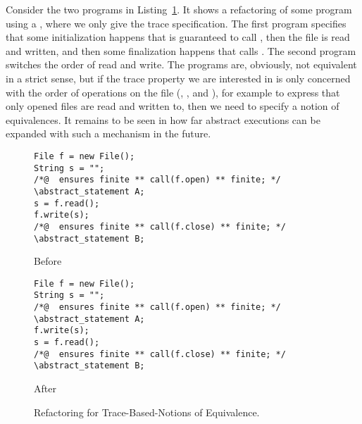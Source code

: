Consider the two programs in Listing~\ref{lst:sth}.
It shows a refactoring of some program using a , where we only give the trace specification.
The first program specifies that some initialization happens that is guaranteed to call , then the file is read and written,
and then some finalization happens that calls .
The second program switches the order of read and write.
The programs are, obviously, not equivalent in a strict sense, but if the trace property we are interested in is only concerned with the order of operations on the file 
(, ,  and ), for example to express that only opened files are read and written to, then we need to specify a notion of equivalences.
It remains to be seen in how far abstract executions can be expanded with such a mechanism in the future.

\begin{figure}[tbp]
\captionsetup{type=lstlisting}
\centering
\begin{sublstlisting}{.8\linewidth}
\begin{lstlisting}[style=refinity]
File f = new File();
String s = "";
/*@  ensures finite ** call(f.open) ** finite; */
\abstract_statement A;     
s = f.read();
f.write(s);
/*@  ensures finite ** call(f.close) ** finite; */
\abstract_statement B;     
\end{lstlisting}
\caption{Before}
\end{sublstlisting}
\begin{sublstlisting}{.8\linewidth}\vspace{1mm}
\begin{lstlisting}[style=refinity]
File f = new File();
String s = "";
/*@  ensures finite ** call(f.open) ** finite; */
\abstract_statement A;     
f.write(s);
s = f.read();
/*@  ensures finite ** call(f.close) ** finite; */
\abstract_statement B;     
\end{lstlisting}
\caption{After}
\end{sublstlisting}
\caption{Refactoring for Trace-Based-Notions of Equivalence.}
\label{lst:sth}
\end{figure}




